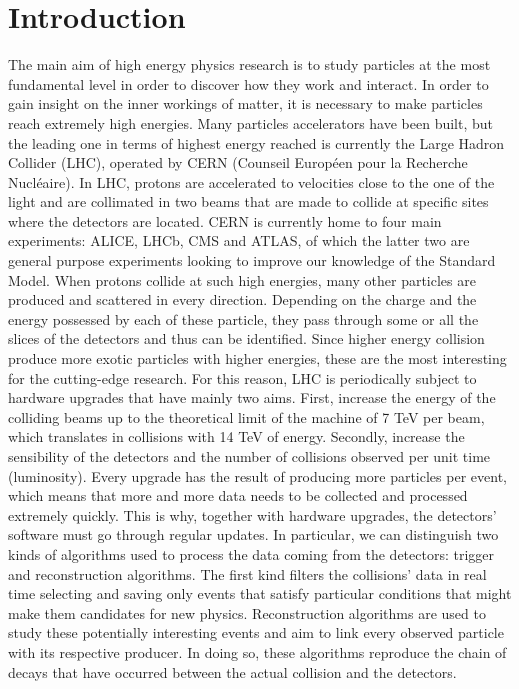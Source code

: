\chapter*{Introduction}
The main aim of high energy physics research is to study particles at the most fundamental level in order to discover how they work and interact. In order to gain insight on the inner workings of matter, it is necessary to make particles reach extremely high energies. Many particles accelerators have been built, but the leading one in terms of highest energy reached is currently the Large Hadron Collider (LHC), operated by CERN (Counseil Européen pour la Recherche Nucléaire). In LHC, protons are accelerated to velocities close to the one of the light and are collimated in two beams that are made to collide at specific sites where the detectors are located. CERN is currently home to four main experiments: ALICE, LHCb, CMS and ATLAS, of which the latter two are general purpose experiments looking to improve our knowledge of the Standard Model. When protons collide at such high energies, many other particles are produced and scattered in every direction. Depending on the charge and the energy possessed by each of these particle, they pass through some or all the slices of the detectors and thus can be identified. Since higher energy collision produce more exotic particles with higher energies, these are the most interesting for the cutting-edge research. For this reason, LHC is periodically subject to hardware upgrades that have mainly two aims. First, increase the energy of the colliding beams up to the theoretical limit of the machine of 7 TeV per beam, which translates in collisions with 14 TeV of energy. Secondly, increase the sensibility of the detectors and the number of collisions observed per unit time (luminosity). Every upgrade has the result of producing more particles per event, which means that more and more data needs to be collected and processed extremely quickly. This is why, together with hardware upgrades, the detectors' software must go through regular updates. In particular, we can distinguish two kinds of algorithms used to process the data coming from the detectors: trigger and reconstruction algorithms. The first kind filters the collisions' data in real time selecting and saving only events that satisfy particular conditions that might make them candidates for new physics. Reconstruction algorithms are used to study these potentially interesting events and aim to link every observed particle with its respective producer. In doing so, these algorithms reproduce the chain of decays that have occurred between the actual collision and the detectors. \newline

